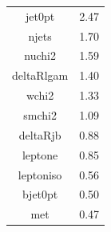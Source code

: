 \documentclass[10pt]{beamer}
\begin{document}
{\begin{columns}
\begin{column}{0.48\textwidth}
{\begin{tabular}{c c}
jet0pt & 2.47 \\
njets & 1.70 \\
nuchi2 & 1.59 \\
deltaRlgam & 1.40 \\
wchi2 & 1.33 \\
smchi2 & 1.09 \\
deltaRjb & 0.88 \\
leptone & 0.85 \\
leptoniso & 0.56 \\
bjet0pt & 0.50 \\
met & 0.47 \\
\end{tabular}
}
\end{column}
\end{columns}
}
%
%	
%	


%
%
%
\end{document}
